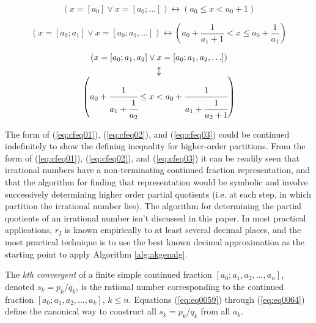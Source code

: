 \documentclass{esub2acm}
\begin{document}
\begin{equation}
\label{eq:cfeq01}
(x=[a_0] \vee x=[a_0; \ldots ] ) \leftrightarrow (a_0 \leq x < a_0 + 1)
\end{equation}

\begin{equation}
\label{eq:cfeq02}
(x=[a_0; a_1] \vee x=[a_0; a_1, \ldots ] ) \leftrightarrow
\left(
{
a_0 + \frac{1}{a_1 + 1} < x \leq a_0 + \frac{1}{a_1}
}
\right)
\end{equation}

\begin{equation}
\label{eq:cfeq03}
\begin{array}{c}
 (x=[a_0; a_1, a_2] \vee x=[a_0; a_1, a_2, \ldots ] ) \vspace{0.05in}\\
\updownarrow \vspace{0.0in}\\
\left(
{
a_0+\cfrac{1}{a_1 + \cfrac{1}{a_2}} \leq x < a_0+\cfrac{1}{a_1 + \cfrac{1}{a_2+1}}
}
\right)
\end{array}
\end{equation}

The form of (\ref{eq:cfeq01}), (\ref{eq:cfeq02}),
and (\ref{eq:cfeq03}) could be continued indefinitely to show the
defining inequality for higher-order partitions.
From the form of (\ref{eq:cfeq01}), (\ref{eq:cfeq02}),
and (\ref{eq:cfeq03}) it can be readily seen that irrational numbers have a
non-terminating
continued fraction representation, and that the algorithm for finding that
representation would be symbolic and involve successively determining
higher order partial quotients (i.e. at each step, in which
partition the irrational number lies).  The algorithm for determining
the partial quotients of an irrational number isn't discussed in this
paper.
In most practical applications, $r_I$ is known empirically to at least several
decimal places, and the most practical technique is to use the
best known decimal
approximation as the starting point to apply Algorithm \ref{alg:akgenalg}.


The \emph{kth convergent} of a finite simple continued fraction
$[a_{0};a_{1},a_{2},\ldots{},a_{n}]$,
denoted $s_{k} = p_k/q_k$, is the rational number corresponding to the
continued fraction $[a_{0};a_{1},a_{2},\ldots{},a_{k}]$,
$k \leq n$.  Equations (\ref{eq:eq0059}) through (\ref{eq:eq0064})
define the canonical way to
construct all $s_{k}=p_{k}/q_{k}$ from all $a_{k}$.
\end{document}
